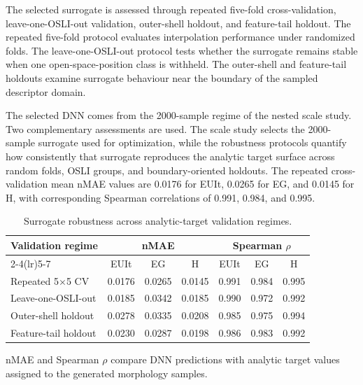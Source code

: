 \documentclass[final,3p,times,numbers,sort&compress]{elsarticle}
\newcommand{\maintablesetup}{%
  \small
  \setlength{\tabcolsep}{4.5pt}%
  \renewcommand{\arraystretch}{1.08}%
}
\begin{document}
The selected surrogate is assessed through repeated five-fold cross-validation, leave-one-OSLI-out validation, outer-shell holdout, and feature-tail holdout. The repeated five-fold protocol evaluates interpolation performance under randomized folds. The leave-one-OSLI-out protocol tests whether the surrogate remains stable when one open-space-position class is withheld. The outer-shell and feature-tail holdouts examine surrogate behaviour near the boundary of the sampled descriptor domain.

The selected DNN comes from the 2000-sample regime of the nested scale study. Two complementary assessments are used. The scale study selects the 2000-sample surrogate used for optimization, while the robustness protocols quantify how consistently that surrogate reproduces the analytic target surface across random folds, OSLI groups, and boundary-oriented holdouts. The repeated cross-validation mean nMAE values are 0.0176 for EUIt, 0.0265 for EG, and 0.0145 for H, with corresponding Spearman correlations of 0.991, 0.984, and 0.995.

\begin{table}[!htbp]
\centering
\caption{Surrogate robustness across analytic-target validation regimes.}
\label{tab:surrogate-robustness}
\maintablesetup
\begin{threeparttable}

\begin{tabular*}{\linewidth}{@{\extracolsep{\fill}}lcccccc@{}}
\toprule
Validation regime &
\multicolumn{3}{c}{nMAE} &
\multicolumn{3}{c}{Spearman $\rho$} \\
\cmidrule(lr){2-4}\cmidrule(lr){5-7}
& EUIt & EG & H & EUIt & EG & H \\
\midrule
Repeated 5$\times$5 CV & 0.0176 & 0.0265 & 0.0145 & 0.991 & 0.984 & 0.995 \\
Leave-one-OSLI-out & 0.0185 & 0.0342 & 0.0185 & 0.990 & 0.972 & 0.992 \\
Outer-shell holdout & 0.0278 & 0.0335 & 0.0208 & 0.985 & 0.975 & 0.994 \\
Feature-tail holdout & 0.0230 & 0.0287 & 0.0198 & 0.986 & 0.983 & 0.992 \\
\bottomrule
\end{tabular*}
\begin{tablenotes}[flushleft]
\footnotesize
\item nMAE and Spearman $\rho$ compare DNN predictions with analytic target values assigned to the generated morphology samples.
\end{tablenotes}
\end{threeparttable}

\end{table}
\end{document}
